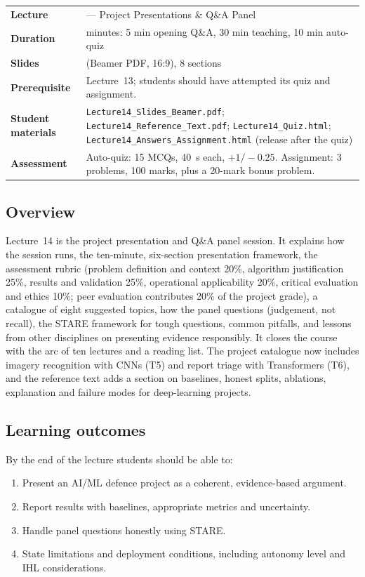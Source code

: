 \documentclass[11pt]{article}
\begin{document}
\begin{center}\small\renewcommand{\arraystretch}{1.25}\begin{tabularx}{\textwidth}{@{}>{\bfseries}p{3.3cm}>{\raggedright\arraybackslash}X@{}}\toprule

\textcolor{NavyN}{Lecture}&14 --- Project Presentations \& Q\&A Panel\\
\textcolor{NavyN}{Duration}&45 minutes: 5 min opening Q\&A, 30 min teaching, 10 min auto-quiz\\
\textcolor{NavyN}{Slides}&11 (Beamer PDF, 16:9), 8 sections\\
\textcolor{NavyN}{Prerequisite}&Lecture~13; students should have attempted its quiz and assignment.\\
\textcolor{NavyN}{Student materials}&\texttt{Lecture14\_Slides\_Beamer.pdf}; \texttt{Lecture14\_Reference\_Text.pdf}; \texttt{Lecture14\_Quiz.html}; \texttt{Lecture14\_Answers\_Assignment.html} (release after the quiz)\\
\textcolor{NavyN}{Assessment}&Auto-quiz: 15 MCQs, 40~s each, $+1/-0.25$. Assignment: 3 problems, 100 marks, plus a 20-mark bonus problem.\\\bottomrule\end{tabularx}\end{center}

\subsection*{Overview}Lecture~14 is the project presentation and Q\&A panel session. It explains how the session runs, the ten-minute, six-section presentation framework, the assessment rubric (problem definition and context 20\%, algorithm justification 25\%, results and validation 25\%, operational applicability 20\%, critical evaluation and ethics 10\%; peer evaluation contributes 20\% of the project grade), a catalogue of eight suggested topics, how the panel questions (judgement, not recall), the STARE framework for tough questions, common pitfalls, and lessons from other disciplines on presenting evidence responsibly. It closes the course with the arc of ten lectures and a reading list. The project catalogue now includes imagery recognition with CNNs (T5) and report triage with Transformers (T6), and the reference text adds a section on baselines, honest splits, ablations, explanation and failure modes for deep-learning projects.

\subsection*{Learning outcomes}By the end of the lecture students should be able to:\begin{enumerate}\item Present an AI/ML defence project as a coherent, evidence-based argument.\item Report results with baselines, appropriate metrics and uncertainty.\item Handle panel questions honestly using STARE.\item State limitations and deployment conditions, including autonomy level and IHL considerations.\end{enumerate}
\end{document}
